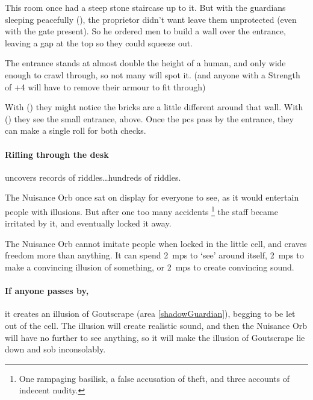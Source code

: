 \begin{multicols}{2}

\begin{exampletext}
  This room once had a steep stone staircase up to it.
  But with the guardians sleeping peacefully (), the proprietor didn't want leave them unprotected (even with the gate present).
  So he ordered men to build a wall over the entrance, leaving a gap at the top so they could squeeze out.
\end{exampletext}

The entrance stands at almost double the height of a human, and only wide enough to crawl through, so not many will spot it.
(and anyone with a Strength of +4 will have to remove their armour to fit through)

With  (\tn[14]) they might notice the bricks are a little different around that wall.
With  (\tn[12]) they see the small entrance, above.
Once the \glspl{pc} pass by the entrance, they can make a single roll for both checks.

\paragraph{Rifling through the desk}
uncovers records of riddles\ldots hundreds of riddles.


\begin{exampletext}
  The Nuisance Orb once sat on display for everyone to see, as it would entertain people with illusions.
  But after one too many accidents%
  \footnote{One rampaging \gls{basilisk}, a false accusation of theft, and three accounts of indecent nudity.}
  the staff became irritated by it, and eventually locked it away.
\end{exampletext}

The Nuisance Orb cannot imitate people when locked in the little cell, and craves freedom more than anything.
It can spend 2~\glspl{mp} to `see' around itself, 2~\glspl{mp} to make a convincing illusion of something, or 2~\glspl{mp} to create convincing sound.

\paragraph{If anyone passes by,}
it creates an illusion of Goutscrape (area \vref{shadowGuardian}), begging to be let out of the cell.
The illusion will create realistic sound, and then the Nuisance Orb will have no further  to see anything, so it will make the illusion of Goutscrape lie down and sob inconsolably.


\end{multicols}
